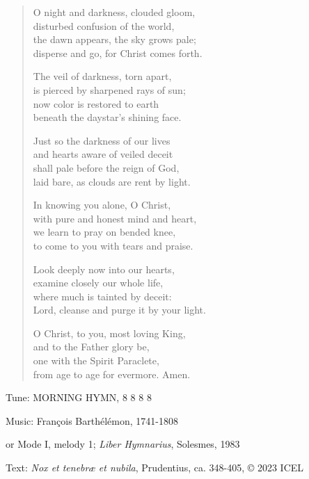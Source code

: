 \hymn

\begin{verse}
O night and darkness, clouded gloom,\\
disturbed confusion of the world,\\
the dawn appears, the sky grows pale;\\
disperse and go, for Christ comes forth.

The veil of darkness, torn apart,\\
is pierced by sharpened rays of sun;\\
now color is restored to earth\\
beneath the daystar’s shining face.

Just so the darkness of our lives\\
and hearts aware of veiled deceit\\
shall pale before the reign of God,\\
laid bare, as clouds are rent by light.

In knowing you alone, O Christ,\\
with pure and honest mind and heart,\\
we learn to pray on bended knee,\\
to come to you with tears and praise.

Look deeply now into our hearts,\\
examine closely our whole life,\\
where much is tainted by deceit:\\
Lord, cleanse and purge it by your light.

O Christ, to you, most loving King,\\
and to the Father glory be,\\
one with the Spirit Paraclete,\\
from age to age for evermore. Amen.
\end{verse}

\begin{hymnsource}
Tune: MORNING HYMN, 8 8 8 8

Music: François Barthélémon, 1741-1808

or Mode I, melody 1; \emph{Liber Hymnarius}, Solesmes, 1983

Text: \emph{Nox et tenebræ et nubila}, Prudentius, ca. 348-405, © 2023 ICEL
\end{hymnsource}
